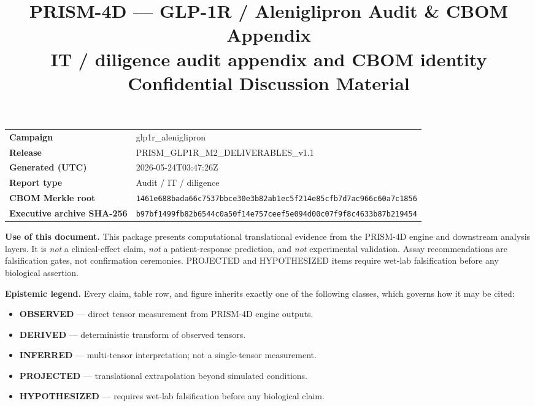 \documentclass[11pt,a4paper]{article}
\title{
  \vspace{-12mm}
  {\color{DelfBlue}\textbf{\Large PRISM-4D — GLP-1R / Aleniglipron Audit \& CBOM Appendix}}\\[2pt]
  {\color{DelfGrey}\normalsize IT / diligence audit appendix and CBOM identity}\\[6pt]
  {\color{DelfGrey}\small Confidential Discussion Material}
}
\author{}
\date{}
\newcommand{\epOBS}{\textcolor{EpObserved}{\textbf{OBSERVED}}}
\newcommand{\epDER}{\textcolor{EpDerived}{\textbf{DERIVED}}}
\newcommand{\epINF}{\textcolor{EpInferred}{\textbf{INFERRED}}}
\newcommand{\epPRJ}{\textcolor{EpProjected}{\textbf{PROJECTED}}}
\newcommand{\epHYP}{\textcolor{EpHypothesized}{\textbf{HYPOTHESIZED}}}
\begin{document}
\maketitle
\vspace{-14mm}

\begin{flushleft}
\small
\begin{tabular}{@{}p{}p{}@{}}
\textbf{Campaign}             & glp1r\_aleniglipron \\
\textbf{Release}              & PRISM\_GLP1R\_M2\_DELIVERABLES\_v1.1 \\
\textbf{Generated (UTC)}      & 2026-05-24T03:47:26Z \\
\textbf{Report type}          & Audit / IT / diligence \\
\textbf{CBOM Merkle root}     & \texttt{\small 1461e688bada66c7537bbce30e3b82ab1ec5f214e85cfb7d7ac966c60a7c1856} \\
\textbf{Executive archive SHA-256} & \texttt{\small b97bf1499fb82b6544c0a50f14e757ceef5e094d00c07f9f8c4633b87b219454} \\
\end{tabular}
\end{flushleft}

\vspace{4mm}

\begin{disclaimerbox}
\textbf{Use of this document.} This package presents computational
translational evidence from the PRISM-4D engine and downstream analysis
layers. It is \emph{not} a clinical-effect claim, \emph{not} a
patient-response prediction, and \emph{not} experimental validation.
Assay recommendations are falsification gates, not confirmation
ceremonies. PROJECTED and HYPOTHESIZED items require wet-lab
falsification before any biological assertion.
\end{disclaimerbox}

\begin{legendbox}
\textbf{Epistemic legend.} Every claim, table row, and figure inherits
exactly one of the following classes, which governs how it may be cited:
\begin{itemize}[leftmargin=18pt,topsep=2pt,itemsep=1pt]
  \item \epOBS{} — direct tensor measurement from PRISM-4D engine outputs.
  \item \epDER{} — deterministic transform of observed tensors.
  \item \epINF{} — multi-tensor interpretation; not a single-tensor measurement.
  \item \epPRJ{} — translational extrapolation beyond simulated conditions.
  \item \epHYP{} — requires wet-lab falsification before any biological claim.
\end{itemize}
\end{legendbox}
\end{document}
